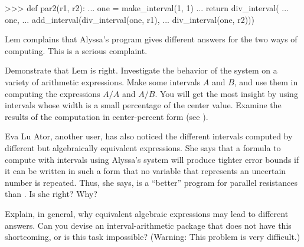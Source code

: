 \begin{exerciseGroup}
\begin{codeBlock}
>>> def par2(r1, r2):
...     one = make_interval(1, 1)
...     return div_interval(
...         one,
...         add_interval(div_interval(one, r1),
...                      div_interval(one, r2)))
\end{codeBlock}

Lem complains that Alyssa's program gives different answers for the two ways of
computing. This is a serious complaint.

\label{Exercise 2.14}
 Demonstrate that Lem is right.
Investigate the behavior of the system on a variety of arithmetic
expressions. Make some intervals \( A \) and \( B \), and use them in computing the
expressions \( A / A \) and \( A / B \).  You will get the most insight by
using intervals whose width is a small percentage of the center value. Examine
the results of the computation in center-percent form (see ).

\label{Exercise 2.15}
 Eva Lu Ator, another user, has
also noticed the different intervals computed by different but algebraically
equivalent expressions. She says that a formula to compute with intervals using
Alyssa's system will produce tighter error bounds if it can be written in such
a form that no variable that represents an uncertain number is repeated.  Thus,
she says,  is a ``better'' program for parallel resistances than
.  Is she right?  Why?

\label{Exercise 2.16}
 Explain, in general, why
equivalent algebraic expressions may lead to different answers.  Can you devise
an interval-arithmetic package that does not have this shortcoming, or is this
task impossible?  (Warning: This problem is very difficult.)
\end{exerciseGroup}


